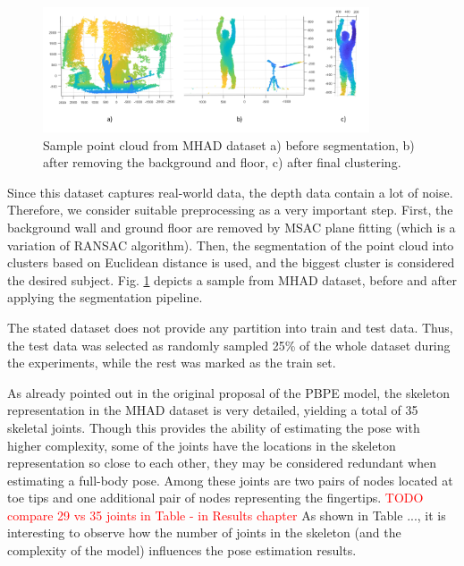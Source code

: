 \begin{figure}[H]
\begin{center}
  \includegraphics[height=140px]{images/implementation/mhad.png}
  \caption[Sample point cloud from MHAD dataset \cite{Vidal:2013:BMC:2478277.2478412}.]{ Sample point cloud from MHAD dataset \cite{Vidal:2013:BMC:2478277.2478412} a) before segmentation, b) after removing the background and floor, c) after final clustering.}
  \label{fig:mhad}
\end{center}
\end{figure}

\noindent
Since this dataset captures real-world data, the depth data contain a lot of noise. Therefore, we consider suitable preprocessing as a very important step. First, the background wall and ground floor are removed by MSAC plane fitting (which is a variation of RANSAC algorithm). Then, the segmentation of the point cloud into clusters based on Euclidean distance is used, and the biggest cluster is considered the desired subject. Fig. \ref{fig:mhad} depicts a sample from MHAD dataset, before and after applying the segmentation pipeline.\par

\vspace{5mm}
\noindent
The stated dataset does not provide any partition into train and test data. Thus, the test data was selected as randomly sampled 25\% of the whole dataset during the experiments, while the rest was marked as the train set.\par
\vspace{5mm}
\noindent 
As already pointed out in the original proposal of the PBPE model, the skeleton representation in the MHAD dataset is very detailed, yielding a total of 35 skeletal joints. Though this provides the ability of estimating the pose with higher complexity, some of the joints have the locations in the skeleton representation so close to each other, they may be considered redundant when estimating a full-body pose. Among these joints are two pairs of nodes located at toe tips and one additional pair of nodes representing the fingertips.
\textcolor{red}{TODO compare 29 vs 35 joints in Table - in Results chapter} As shown in Table ..., it is interesting to observe how the number of joints in the skeleton (and the complexity of the model) influences the pose estimation results.



